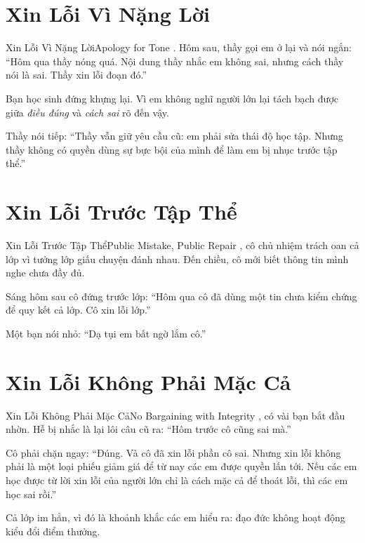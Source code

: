 \section{Xin Lỗi Vì Nặng Lời}
\begin{truyen}{Xin Lỗi Vì Nặng Lời}{Apology for Tone}
. Hôm sau, thầy gọi em ở lại và nói ngắn: ``Hôm qua thầy nóng quá. Nội dung thầy nhắc em không sai, nhưng cách thầy nói là sai. Thầy xin lỗi đoạn đó.''

Bạn học sinh đứng khựng lại. Vì em không nghĩ người lớn lại tách bạch được giữa \textit{điều đúng} và \textit{cách sai} rõ đến vậy.

Thầy nói tiếp: ``Thầy vẫn giữ yêu cầu cũ: em phải sửa thái độ học tập. Nhưng thầy không có quyền dùng sự bực bội của mình để làm em bị nhục trước tập thể.''
\end{truyen}

\section{Xin Lỗi Trước Tập Thể}
\begin{truyen}{Xin Lỗi Trước Tập Thể}{Public Mistake, Public Repair}
, cô chủ nhiệm trách oan cả lớp vì tưởng lớp giấu chuyện đánh nhau. Đến chiều, cô mới biết thông tin mình nghe chưa đầy đủ.

Sáng hôm sau cô đứng trước lớp: ``Hôm qua cô đã dùng một tin chưa kiểm chứng để quy kết cả lớp. Cô xin lỗi lớp.''

Một bạn nói nhỏ: ``Dạ tụi em bất ngờ lắm cô.''

\end{truyen}

\section{Xin Lỗi Không Phải Mặc Cả}
\begin{truyen}{Xin Lỗi Không Phải Mặc Cả}{No Bargaining with Integrity}
, có vài bạn bắt đầu nhờn. Hễ bị nhắc là lại lôi câu cũ ra: ``Hôm trước cô cũng sai mà.''

Cô phải chặn ngay: ``Đúng. Và cô đã xin lỗi phần cô sai. Nhưng xin lỗi không phải là một loại phiếu giảm giá để từ nay các em được quyền lấn tới. Nếu các em học được từ lời xin lỗi của người lớn chỉ là cách mặc cả để thoát lỗi, thì các em học sai rồi.''

Cả lớp im hẳn, vì đó là khoảnh khắc các em hiểu ra: đạo đức không hoạt động kiểu đổi điểm thưởng.
\end{truyen}

